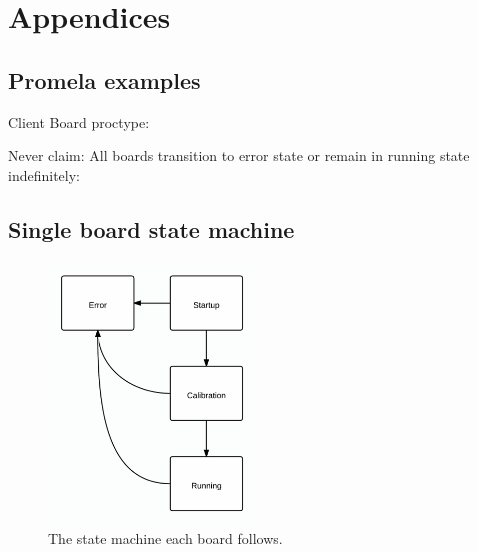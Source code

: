 \section{Appendices}

\subsection{Promela examples}
Client Board proctype:


\pagebreak
Never claim: All boards transition to error state
or remain in running state indefinitely:


\subsection{Single board state machine}

\begin{figure}[!ht]
  \caption{The state machine each board follows.}
  \label{states}
  \centering
    \includegraphics[width=0.5\textwidth]{states}
\end{figure}
